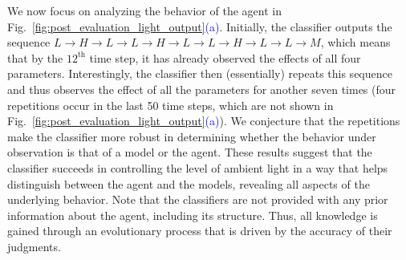 We now focus on analyzing the behavior of the agent in Fig.~\ref{fig:post_evaluation_light_output}\textcolor{blue}{(a)}. Initially, the classifier outputs the sequence $L \rightarrow H\rightarrow L\rightarrow L \rightarrow H\rightarrow L\rightarrow L\rightarrow H\rightarrow L\rightarrow L\rightarrow M$, which means that by the $12^\textrm{th}$ time step, it has already observed the effects of all four parameters. Interestingly, the classifier then (essentially) repeats this sequence and thus observes the effect of all the parameters for another seven times (four repetitions occur in the last 50 time steps, which are not shown in Fig.~\ref{fig:post_evaluation_light_output}\textcolor{blue}{(a)}). We conjecture that the repetitions make the classifier more robust in determining whether the behavior under observation is that of a model or the agent.
These results suggest that the classifier succeeds in controlling the level of ambient light in a way that helps distinguish between the agent and the models, revealing all aspects of the underlying behavior. Note that the classifiers are not provided with any prior information about the agent, including its structure. Thus, all knowledge is gained through an evolutionary process that is driven by the accuracy of their judgments.

